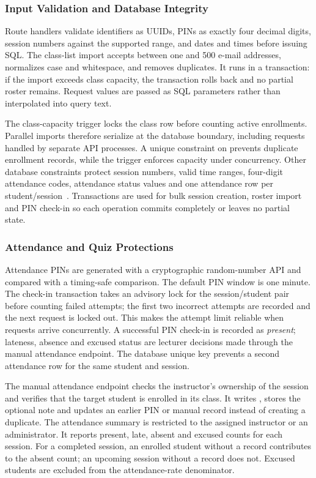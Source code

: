 \subsubsection{Input Validation and Database Integrity}

Route handlers validate identifiers as UUIDs, PINs as exactly four decimal digits, session numbers against the supported range, and dates and times before issuing SQL. The class-list import accepts between one and 500 e-mail addresses, normalizes case and whitespace, and removes duplicates. It runs in a transaction: if the import exceeds class capacity, the transaction rolls back and no partial roster remains. Request values are passed as SQL parameters rather than interpolated into query text.

The class-capacity trigger locks the class row before counting active enrollments. Parallel imports therefore serialize at the database boundary, including requests handled by separate API processes. A unique constraint on  prevents duplicate enrollment records, while the trigger enforces capacity under concurrency. Other database constraints protect session numbers, valid time ranges, four-digit attendance codes, attendance status values and one attendance row per student/session~\cite{postgresdocs}. Transactions are used for bulk session creation, roster import and PIN check-in so each operation commits completely or leaves no partial state.

\subsubsection{Attendance and Quiz Protections}

Attendance PINs are generated with a cryptographic random-number API and compared with a timing-safe comparison. The default PIN window is one minute. The check-in transaction takes an advisory lock for the session/student pair before counting failed attempts; the first two incorrect attempts are recorded and the next request is locked out. This makes the attempt limit reliable when requests arrive concurrently. A successful PIN check-in is recorded as \emph{present}; lateness, absence and excused status are lecturer decisions made through the manual attendance endpoint. The database unique key prevents a second attendance row for the same student and session.

The manual attendance endpoint checks the instructor's ownership of the session and verifies that the target student is enrolled in its class. It writes , stores the optional note and updates an earlier PIN or manual record instead of creating a duplicate. The attendance summary is restricted to the assigned instructor or an administrator. It reports present, late, absent and excused counts for each session. For a completed session, an enrolled student without a record contributes to the absent count; an upcoming session without a record does not. Excused students are excluded from the attendance-rate denominator.


